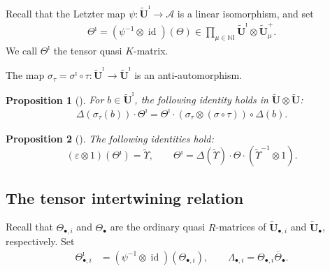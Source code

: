 \documentclass[a4paper,reqno,12pt]{amsart}
\numberwithin{equation}{section}
\newtheorem{proposition}{Proposition}[section]
\theoremstyle{definition}
\theoremstyle{plain}
\theoremstyle{definition}
\def\N{\mathbb N}
\def\I{\mathbb I}
\def\tU{\widetilde{\mathbf U}}
\def\tUi{\widetilde{\mathbf U}^{\imath}}
\def \tbU{\tU_{\bullet}}
\def\tfX{\widetilde\Upsilon}
\def\cA{\mathcal A}
\newcommand{\id}{\operatorname{id}}
\begin{document}
Recall that the Letzter map $\psi:\tUi\rightarrow \cA$ is a linear isomorphism, and set
\begin{align}\label{eq:TB-def}
  \Theta^\imath=(\psi^{-1}\otimes \id)(\Theta) \in \prod_{\mu\in \N\I} \tUi\otimes \tU^+_\mu.
\end{align}
We call $\Theta^\imath$ the tensor quasi $K$-matrix. 

The map $\sigma_\tau=\sigma^\imath\circ\tau:\tUi\rightarrow \tUi$ is an anti-automorphism. 
\begin{proposition}[{\cite[Theorem 5.8]{KY26}}]
    \label{thm:intertwiner2}
  For $b\in \tUi$, the following identity holds in $\tU \widehat{\otimes} \tU$:
  \begin{align}\label{eq:intertwiner2}
    \Delta(\sigma_\tau(b)) \cdot\Theta^\imath = \Theta^\imath\cdot (\sigma_\tau\otimes(\sigma\circ\tau))\circ \Delta(b).
  \end{align}
\end{proposition}

\begin{proposition}[{\cite[Corollaries 5.10, 5.11]{KY26}}]
The following identities hold:
 \begin{equation}\label{description of the tqK}
     (\varepsilon\otimes 1)(\Theta^\imath)=\tfX,\qquad \Theta^\imath= \Delta(\tfX)\cdot \Theta\cdot(\tfX^{-1}\otimes 1).
 \end{equation}
\end{proposition}
    
\subsection{The tensor intertwining relation}
Recall that $\Theta_{\bullet,i}$ and $\Theta_\bullet$ are the ordinary quasi
$R$-matrices of $\tU_{\bullet,i}$ and $\tbU$, respectively. Set
\begin{align}
    \Theta_{\bullet,i}^{\imath}
&=(\psi^{-1}\otimes\id)(\Theta_{\bullet,i}),
\qquad\Lambda_{\bullet,i}=\Theta_{\bullet,i}\overline\Theta_\bullet.
\label{eq:local tensor-definition}
\end{align}
\end{document}
